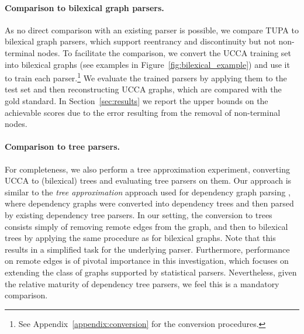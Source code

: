 \documentclass[11pt,a4paper]{article}
\newcommand{\parser}[1]{TUPA\textsubscript{#1}}
\newcommand{\secref}[1]{Section~\ref{#1}}
\newcommand{\figref}[1]{Figure~\ref{#1}}
\begin{document}
\paragraph{Comparison to bilexical graph parsers.}
As no direct comparison with an existing parser is possible,
we compare \parser{} to bilexical graph parsers,
which support reentrancy and discontinuity but not non-terminal nodes.
To facilitate the comparison, we convert the UCCA training set into bilexical graphs
(see examples in \figref{fig:bilexical_example})
and use it to train each parser.\footnote{See Appendix~\ref{appendix:conversion}
for the conversion procedures.}
We evaluate the trained parsers by applying them to the test set
and then reconstructing UCCA graphs, which are compared with the gold standard.
In \secref{sec:results} we report the upper bounds on the achievable scores due to the error
resulting from the removal of non-terminal nodes.

\paragraph{Comparison to tree parsers.}
For completeness,
we also perform a tree approximation experiment, converting UCCA to (bilexical) trees
and evaluating tree parsers on them.
Our approach is similar
to the \textit{tree approximation} approach used for dependency graph parsing
\cite{agic2015semantic,fernandez2015parsing},
where dependency graphs were converted into dependency trees
and then parsed by existing dependency tree parsers.
In our setting, the conversion to trees consists simply of removing remote edges from the 
graph, and then to bilexical trees by applying the same procedure as for bilexical graphs.
Note that this results in a simplified task for the underlying parser.
Furthermore, performance on remote edges is of pivotal importance in this investigation,
which focuses on extending the class of graphs supported by statistical parsers.
Nevertheless, given the relative maturity of dependency tree parsers, we feel this is
a mandatory comparison.
\end{document}
